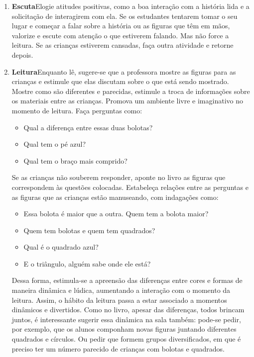 \documentclass[11pt]{extarticle}
\begin{document}
\begin{enumerate}
\item \textbf{Escuta}\quad Elogie atitudes positivas, como 
a boa interação com a história lida e a solicitação de interagirem com ela. Se os estudantes tentarem 
tomar o seu lugar e começar a falar sobre a história ou as figuras que têm em mãos, valorize e escute com atenção o que estiverem falando. Mas não 
force a leitura. Se as crianças estiverem cansadas, faça outra atividade 
e retorne depois. 



\item \textbf{Leitura}\quad Enquanto lê, sugere-se que a professora mostre as figuras para as crianças e estimule que elas discutam sobre o que está sendo mostrado.
Mostre como são diferentes e parecidas, estimule a troca de informações sobre os materiais entre as crianças. Promova um ambiente livre e imaginativo no momento de leitura. 
Faça perguntas como:

\begin{itemize}
\item Qual a diferença entre essas duas bolotas?
\item Qual tem o pé azul?
\item Qual tem o braço mais comprido?
\end{itemize}

Se as crianças não souberem responder, aponte no livro as figuras que correspondem às questões colocadas. Estabeleça relações entre as perguntas e as figuras que as crianças estão manuseando, com indagações como:

\begin{itemize}
\item Essa bolota é maior que a outra. Quem tem a bolota maior?
\item Quem tem bolotas e quem tem quadrados?
\item Qual é o quadrado azul?
\item E o triângulo, alguém sabe onde ele está?
\end{itemize}

Dessa forma, estimula-se a apreensão das diferenças entre cores e formas de maneira dinâmica e lúdica, aumentando a interação com o momento da leitura. Assim, o hábito da leitura passa a estar associado a momentos dinâmicos e divertidos.
Como no livro, apesar das diferenças, todos brincam juntos, é interessante sugerir essa dinâmica na sala também: pode-se pedir, por exemplo, que os alunos componham novas figuras juntando diferentes quadrados e círculos. Ou pedir que formem grupos diversificados, em que é preciso ter um número parecido de crianças com bolotas e quadrados. 



\end{enumerate}
\end{document}
